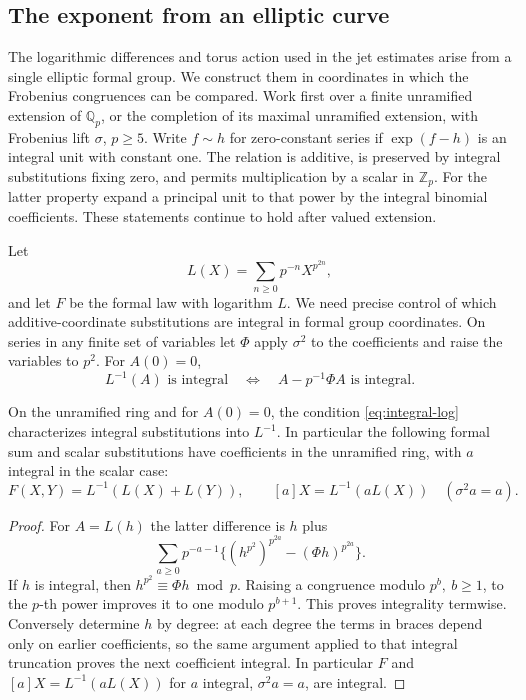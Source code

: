 \subsection{The exponent from an elliptic curve}
\label{subsec:curve-exponents}
\hypertarget{source-curve-exponents}{}

The logarithmic differences and torus action used in the jet estimates arise from a single elliptic formal group. We construct them in coordinates in which the Frobenius congruences can be compared. Work first over a finite
unramified extension of \(\mathbb Q_p\), or the completion of its maximal
unramified extension, with Frobenius lift \(\sigma\), \(p\ge5\).
Write \(f\sim h\) for zero-constant series if \(\exp(f-h)\)
is an integral unit with constant one. The relation is additive,
is preserved by integral substitutions fixing zero, and permits
multiplication by a scalar in \(\mathbb Z_p\). For the latter
property expand a principal unit to that power by the integral
binomial coefficients. These statements continue to hold after
valued extension.

Let 
\[
  L(X)=\sum_{n\ge0}p^{-n}X^{p^{2n}},
\]
 and let \(F\) be
the formal law with logarithm \(L\). We need precise control
of which additive-coordinate substitutions are integral in
formal group coordinates. On series in any finite set of
variables let \(\Phi\) apply \(\sigma^2\) to the coefficients
and raise the variables to \(p^2\). For \(A(0)=0\),
\begin{equation}\label{eq:integral-log}
 L^{-1}(A)\text{ is integral}\quad\Longleftrightarrow\quad
                       A-p^{-1}\Phi A\text{ is integral}.
\end{equation}
\begin{proposition}\label{prop:quadratic-integral-log}
On the unramified ring and for \(A(0)=0\), the condition
\eqref{eq:integral-log} characterizes integral substitutions into
\(L^{-1}\). In particular the following formal sum and scalar substitutions have coefficients in the unramified ring, with \(a\) integral in the scalar case:
\[
 F(X,Y)=L^{-1}(L(X)+L(Y)),\qquad [a]X=L^{-1}(aL(X))\quad(\sigma^2a=a).
\]

\end{proposition}

\begin{proof}
For \(A=L(h)\) the latter difference is \(h\) plus
\[
 \sum_{a\ge0}p^{-a-1}\big\{(h^{p^2})^{p^{2a}}-
                                      (\Phi h)^{p^{2a}}\big\}.
\]
If \(h\) is integral, then \(h^{p^2}\equiv\Phi h\bmod p\).
Raising a congruence modulo \(p^b,\ b\ge1\), to the \(p\)-th
power improves it to one modulo \(p^{b+1}\). This proves
integrality termwise. Conversely determine \(h\) by degree:
at each degree the terms in braces depend only on earlier
coefficients, so the same argument applied to that integral
truncation proves the next coefficient integral. In particular
\(F\) and \([a]X=L^{-1}(aL(X))\) for \(a\) integral,
\(\sigma^2a=a\), are integral.

\end{proof}

